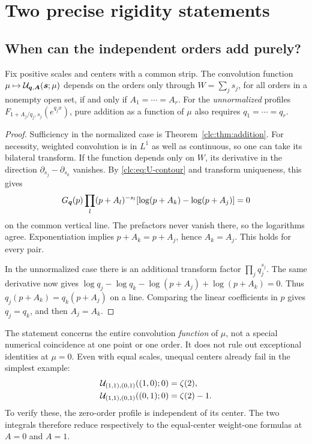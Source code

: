 \section{Two precise rigidity statements}
\label{clc:sec:rigidity}

\subsection{When can the independent orders add purely?}
\begin{theorem}
\label{clc:thm:alignment}
Fix positive scales and centers with a common strip. The convolution
function $\mu\mapsto\mathcal U_{\boldsymbol q,\boldsymbol A}(\boldsymbol s;\mu)$ depends on the orders only
through $W=\sum_js_j$, for all orders in a nonempty open set, if and
only if $A_1=\cdots=A_r$. For the \emph{unnormalized} profiles
$F_{1+A_j/q_j,s_j}(e^{q_jx})$, pure addition as a function of $\mu$
also requires $q_1=\cdots=q_r$.
\end{theorem}
\begin{proof}
Sufficiency in the normalized case is Theorem~\ref{clc:thm:addition}.
For necessity, weighted convolution is in $L^1$ as well as continuous,
so one can take its bilateral transform. If the function depends only
on $W$, its derivative in the direction
$\partial_{s_j}-\partial_{s_k}$ vanishes. By
\eqref{clc:eq:U-contour} and transform uniqueness, this gives
\[
 G_{\boldsymbol q}(p)\prod_l(p+A_l)^{-s_l}
             [\log(p+A_k)-\log(p+A_j)]=0
\]
on the common vertical line. The prefactors never vanish there, so the
logarithms agree. Exponentiation implies $p+A_k=p+A_j$, hence
$A_k=A_j$. This holds for every pair.

In the unnormalized case there is an additional transform factor
$\prod_jq_j^{s_j}$. The same derivative now gives
$\log q_j-\log q_k-\log(p+A_j)+\log(p+A_k)=0$.
Thus $q_j(p+A_k)=q_k(p+A_j)$ on a line. Comparing the linear
coefficients in $p$ gives $q_j=q_k$, and then $A_j=A_k$.
\end{proof}

The statement concerns the entire convolution \emph{function} of $\mu$,
not a special numerical coincidence at one point or one order. It does
not rule out exceptional identities at $\mu=0$. Even with equal scales,
unequal centers already fail in the simplest example:
\begin{align*}
 \mathcal U_{(1,1),(0,1)}((1,0);0)&=\zeta(2),\\
 \mathcal U_{(1,1),(0,1)}((0,1);0)&=\zeta(2)-1.
\end{align*}
To verify these, the zero-order profile is independent of its center.
The two integrals therefore reduce respectively to the equal-center
weight-one formulas at $A=0$ and $A=1$.

